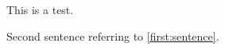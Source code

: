 \documentclass{scrartcl}
\begin{document}
      \begin{inparaenum}[1.]
        \item \label{first:sentence} This is a test.
        \item Second sentence referring to \ref{first:sentence}.
      \end{inparaenum}
    
\end{document}

